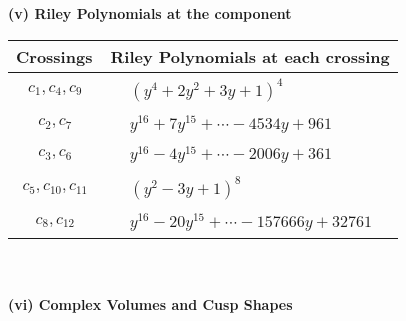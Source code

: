 \documentclass[1p]{elsarticle_modified}
\theoremstyle{definition}
\begin{document}
\newpage\renewcommand{\arraystretch}{1}
\flushleft \textbf{(v) Riley Polynomials at the component}\newline \\
\begin{tabular}{m{50pt}|m{274pt}}
Crossings & \hspace{64pt}Riley Polynomials at each crossing \\
\hline $$\begin{aligned}c_{1},c_{4},c_{9}\end{aligned}$$&$\begin{aligned}
&(y^4+2 y^2+3 y+1)^4
\end{aligned}$\\
\hline $$\begin{aligned}c_{2},c_{7}\end{aligned}$$&$\begin{aligned}
&y^{16}+7 y^{15}+\cdots-4534 y+961
\end{aligned}$\\
\hline $$\begin{aligned}c_{3},c_{6}\end{aligned}$$&$\begin{aligned}
&y^{16}-4 y^{15}+\cdots-2006 y+361
\end{aligned}$\\
\hline $$\begin{aligned}c_{5},c_{10},c_{11}\end{aligned}$$&$\begin{aligned}
&(y^2-3 y+1)^8
\end{aligned}$\\
\hline $$\begin{aligned}c_{8},c_{12}\end{aligned}$$&$\begin{aligned}
&y^{16}-20 y^{15}+\cdots-157666 y+32761
\end{aligned}$\\
\hline
\end{tabular}\\~\\
\newpage\flushleft \textbf{(vi) Complex Volumes and Cusp Shapes}
\end{document}
